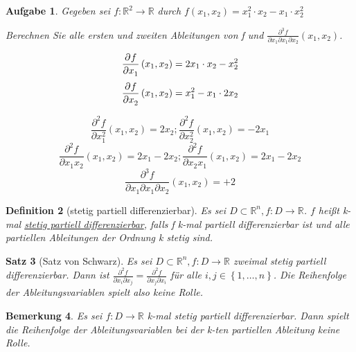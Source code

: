 \documentclass[fontset=ubuntu,12pt,a4paper]{scrreprt}
\newtheorem{defi}{Definition}[section]
\newtheorem{bemerkung}[defi]{Bemerkung}
\newtheorem{satz}[defi]{Satz}
\newtheorem{aufg}[defi]{Aufgabe}
\begin{document}
\begin{aufg}
    Gegeben sei \(f:\mathbb{R}^2\to\mathbb{R}\) durch \(f(x_1,x_2)=x_1^2 \cdot x_2 - x_1 \cdot x_2^2\)

    Berechnen Sie alle ersten und zweiten Ableitungen von f und \(\frac{\partial^3 f}{\partial x_1 \partial x_1 \partial x_2}(x_1,x_2)\).

    \[\dpd{f}{x_1}(x_1,x_2)=2x_1 \cdot x_2 - x_2^2 \]
    \[\dpd{f}{x_2}(x_1,x_2)=x_1^2 - x_1 \cdot 2x_2 \]

    \[\frac{\partial^2 f}{\partial x_1^2}(x_1,x_2)=2x_2 ; \frac{\partial^2 f}{\partial x_2^2}(x_1,x_2)=-2x_1 \]
    \[\frac{\partial^2 f}{\partial x_1x_2}(x_1,x_2)=2x_1-2x_2 ; \frac{\partial^2 f}{\partial x_2x_1}(x_1,x_2)=2x_1-2x_2 \]
    \[\frac{\partial^3 f}{\partial x_1 \partial x_1 \partial x_2}(x_1,x_2)=+2\]
\end{aufg}

\begin{defi}[stetig partiell differenzierbar]
    Es sei \(D\subset\mathbb{R}^n,f:D\to\mathbb{R}\). \(f\) heißt k-mal \underline{stetig partiell differenzierbar}, falls f k-mal partiell differenzierbar ist und alle partiellen Ableitungen der Ordnung k stetig sind.
\end{defi}

\begin{satz}[Satz von Schwarz]
    Es sei \(D\subset\mathbb{R}^n,f:D\to\mathbb{R}\) zweimal stetig partiell differenzierbar. Dann ist \(\frac{\partial^2 f}{\partial x_i \partial x_j}=\frac{\partial^2 f}{\partial x_j \partial x_i}\) für alle \(i,j\in\left\{1,\dots,n\right\}\). Die Reihenfolge der Ableitungsvariablen spielt also keine Rolle.
\end{satz}

\begin{bemerkung}
    Es sei \(f:D\to\mathbb{R}\) k-mal stetig partiell differenzierbar. Dann spielt die Reihenfolge der Ableitungsvariablen bei der k-ten partiellen Ableitung keine Rolle.
\end{bemerkung}
\end{document}
